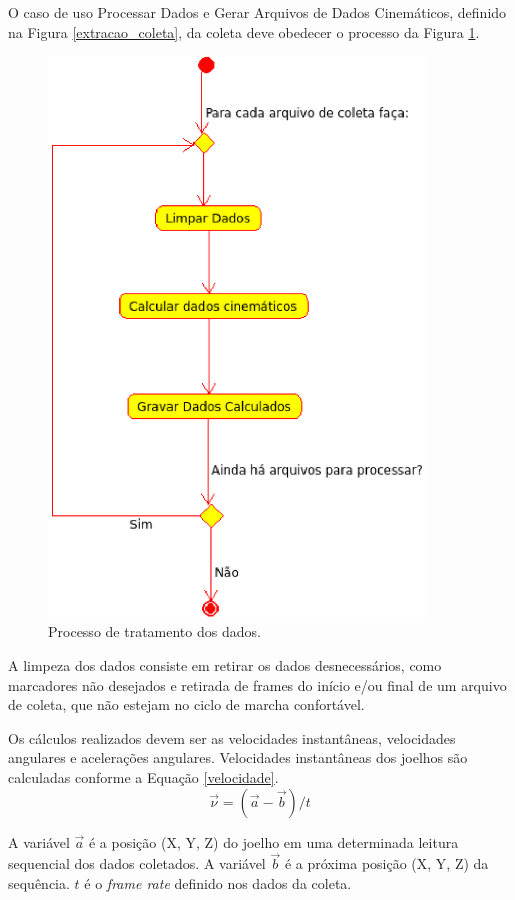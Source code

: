 O caso de uso Processar Dados e Gerar Arquivos de Dados Cinemáticos, definido na Figura \ref{extracao_coleta}, da coleta deve obedecer o processo da Figura \ref{tratamento_dados}.
\begin{figure}[ht]
	\centering
	\includegraphics[width=10cm]{figuras/tratamento_dados.eps}
	\caption{Processo de tratamento dos dados.}
	\label{tratamento_dados}
\end{figure}

A limpeza dos dados consiste em retirar os dados desnecessários, como marcadores não desejados e retirada de frames do início e/ou final de um arquivo de coleta, que não estejam no ciclo de marcha confortável. 

Os cálculos realizados devem ser as velocidades instantâneas, velocidades angulares e acelerações angulares. 
Velocidades instantâneas dos joelhos são calculadas conforme a Equação \ref{velocidade}.
\begin{equation}
	\label{velocidade}
	\vec{\nu} = (\vec{a}-\vec{b})/t 
\end{equation}

A variável $\vec{a}$  é a posição (X, Y, Z) do joelho em uma determinada leitura sequencial dos dados coletados. 
A variável $\vec{b}$ é a próxima posição (X, Y, Z) da sequência. $t$ é o \emph{frame rate} definido nos dados da coleta.

